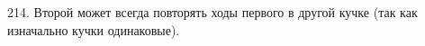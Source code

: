 214. Второй может всегда повторять ходы первого в другой кучке (так как изначально кучки одинаковые).\\
